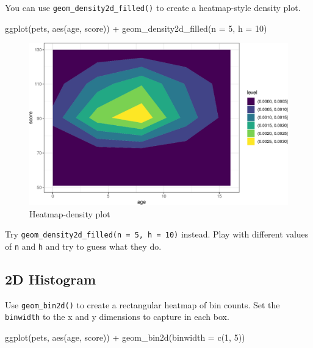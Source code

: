\documentclass[
  oneside]{book}
\newenvironment{Shaded}{\begin{snugshade}}{\end{snugshade}}
\newcommand{\AttributeTok}[1]{\textcolor[rgb]{0.77,0.63,0.00}{#1}}
\newcommand{\DecValTok}[1]{\textcolor[rgb]{0.00,0.00,0.81}{#1}}
\newcommand{\FunctionTok}[1]{\textcolor[rgb]{0.00,0.00,0.00}{#1}}
\newcommand{\NormalTok}[1]{#1}
\newcommand{\SpecialCharTok}[1]{\textcolor[rgb]{0.00,0.00,0.00}{#1}}
\begin{document}
You can use \texttt{geom\_density2d\_filled()} to create a heatmap-style density plot.

\begin{Shaded}
\begin{Highlighting}[]
\FunctionTok{ggplot}\NormalTok{(pets, }\FunctionTok{aes}\NormalTok{(age, score)) }\SpecialCharTok{+}
  \FunctionTok{geom\_density2d\_filled}\NormalTok{(}\AttributeTok{n =} \DecValTok{5}\NormalTok{, }\AttributeTok{h =} \DecValTok{10}\NormalTok{)}
\end{Highlighting}
\end{Shaded}

\begin{figure}

{\centering \includegraphics[width=0.9\linewidth]{images/density2d-fill-1} 

}

\caption{Heatmap-density plot}\label{fig:density2d-fill}
\end{figure}

\begin{try}
Try \texttt{geom\_density2d\_filled(n\ =\ 5,\ h\ =\ 10)} instead. Play with different values of \texttt{n} and \texttt{h} and try to guess what they do.

\end{try}

\hypertarget{geom_bin2d}{%
\subsection{2D Histogram}\label{geom_bin2d}}

Use \texttt{geom\_bin2d()} to create a rectangular heatmap of bin counts. Set the \texttt{binwidth} to the x and y dimensions to capture in each box.

\begin{Shaded}
\begin{Highlighting}[]
\FunctionTok{ggplot}\NormalTok{(pets, }\FunctionTok{aes}\NormalTok{(age, score)) }\SpecialCharTok{+}
  \FunctionTok{geom\_bin2d}\NormalTok{(}\AttributeTok{binwidth =} \FunctionTok{c}\NormalTok{(}\DecValTok{1}\NormalTok{, }\DecValTok{5}\NormalTok{))}
\end{Highlighting}
\end{Shaded}
\end{document}
